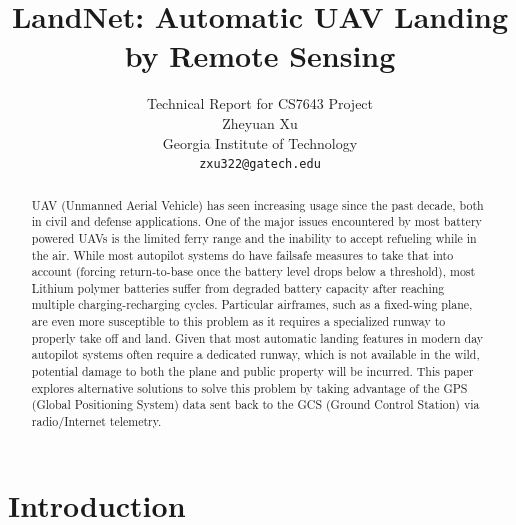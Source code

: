 \documentclass[10pt,twocolumn,letterpaper]{article}
\begin{document}
\title{LandNet: Automatic UAV Landing by Remote Sensing}

\author{Technical Report for CS7643 Project\\
Zheyuan Xu\\
Georgia Institute of Technology\\
{\tt\small zxu322@gatech.edu}
}

\maketitle

\begin{abstract}
   UAV (Unmanned Aerial Vehicle) has seen increasing usage since the past decade, both in civil and defense applications. One of the major issues encountered
by most battery powered UAVs is the limited ferry range and the inability to accept refueling while in the air. While most autopilot systems do have failsafe        measures to take that into account (forcing return-to-base once the battery level drops below a threshold), most Lithium polymer batteries suffer from degraded battery capacity after reaching multiple charging-recharging cycles. Particular airframes, such as a fixed-wing plane, are even more susceptible to this problem as it requires a specialized runway to properly take off and land. Given that most automatic landing features in modern day autopilot systems often require a dedicated runway, which is not available in the wild, potential damage to both the plane and public property will be incurred. This paper explores alternative solutions to solve this problem by taking advantage of the GPS (Global Positioning System) data sent back to the GCS (Ground Control Station) via radio/Internet telemetry. 
\end{abstract}

\section{Introduction}
\end{document}
